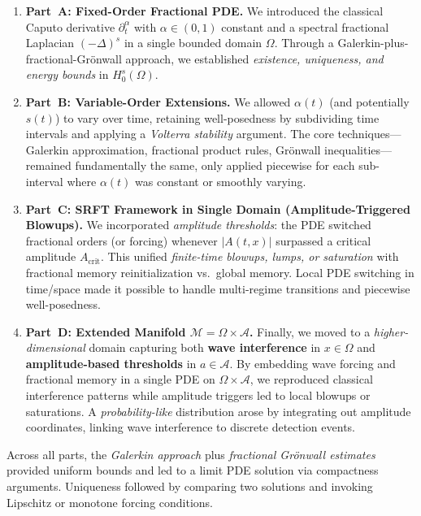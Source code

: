 \documentclass[12pt]{article}
\begin{document}
\begin{enumerate}
\item \textbf{Part~A: Fixed-Order Fractional PDE.} We introduced the classical Caputo 
      derivative \(\partial_t^\alpha\) with $\alpha\in(0,1)$ constant and a spectral 
      fractional Laplacian $(-\Delta)^s$ in a single bounded domain \(\Omega\). 
      Through a Galerkin-plus-fractional-Grönwall approach, we established 
      \emph{existence, uniqueness, and energy bounds} in \(H_0^s(\Omega)\).

\item \textbf{Part~B: Variable-Order Extensions.} We allowed $\alpha(t)$ (and potentially 
      $s(t)$) to vary over time, retaining well-posedness by subdividing time intervals 
      and applying a \emph{Volterra stability} argument. The core techniques—Galerkin 
      approximation, fractional product rules, Grönwall inequalities—remained fundamentally 
      the same, only applied piecewise for each sub-interval where $\alpha(t)$ was constant 
      or smoothly varying.

\item \textbf{Part~C: SRFT Framework in Single Domain (Amplitude-Triggered Blowups).} 
      We incorporated \emph{amplitude thresholds}: the PDE switched fractional orders (or 
      forcing) whenever $|A(t,x)|$ surpassed a critical amplitude $A_{\mathrm{crit}}$. 
      This unified \emph{finite-time blowups, lumps, or saturation} with fractional memory 
      reinitialization vs.\ global memory. Local PDE switching in time/space made it 
      possible to handle multi-regime transitions and piecewise well-posedness.

\item \textbf{Part~D: Extended Manifold \(\mathcal{M}=\Omega\times \mathcal{A}\).} 
      Finally, we moved to a \emph{higher-dimensional} domain capturing both \textbf{wave 
      interference} in $x\in\Omega$ and \textbf{amplitude-based thresholds} in $a\in\mathcal{A}$. 
      By embedding wave forcing and fractional memory in a single PDE on 
      \(\Omega\times \mathcal{A}\), we reproduced classical interference patterns 
      while amplitude triggers led to local blowups or saturations. A \emph{probability-like} 
      distribution arose by integrating out amplitude coordinates, linking wave interference 
      to discrete detection events.
\end{enumerate}

Across all parts, the \emph{Galerkin approach} plus \emph{fractional Grönwall estimates} 
provided uniform bounds and led to a limit PDE solution via compactness arguments. 
Uniqueness followed by comparing two solutions and invoking Lipschitz or monotone forcing 
conditions.
\end{document}
